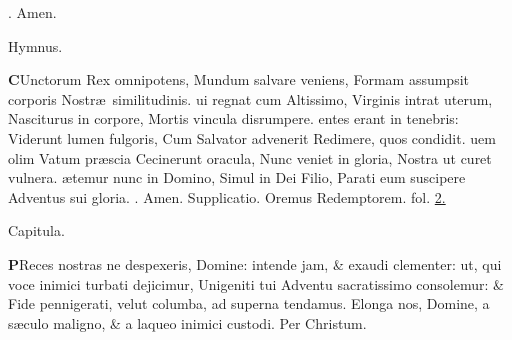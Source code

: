 \documentclass[letter,11pt]{book}
\makeatletter
\DeclareRobustCommand{\Rbar}{\vers@resp{0pt}{R}}
\newcommand{\vers@resp@sym}{\raisebox{0.2ex}{\rotatebox[origin=c]{-20}{$\m@th\rceil$}}}
\newcommand{\vers@resp}[2]{%
  {\ooalign{\hidewidth\kern#1\vers@resp@sym\hidewidth\cr#2\cr}}%
}%
\def\R{\color{Red} \Rbar . \color{black}}
\makeatother
\begin{document}
\begin{multicols}{2}
\newline \R Amen.
\vspace{-.75em} \begin{center} \color{Red} Hymnus. \end{center} \vspace{-.75em}
\lettrine[lines=2]{\bfseries \color{Red} C}{}Unctorum Rex omnipotens,
\newline Mundum salvare veniens,
\newline \indent Formam assumpsit corporis
\newline \indent Nostr\ae \ similitudinis.
ui regnat cum Altissimo,
\newline \indent Virginis intrat uterum,
\newline \indent Nasciturus in corpore,
\newline \indent Mortis vincula disrumpere.
entes erant in tenebris:
\newline \indent Viderunt lumen fulgoris,
\newline \indent Cum Salvator advenerit
\newline \indent Redimere, quos condidit.
uem olim Vatum pr\ae scia
\newline \indent Cecinerunt oracula,
\newline \indent Nunc veniet in gloria,
\newline \indent Nostra ut curet vulnera.
\ae temur nunc in Domino,
\newline \indent Simul in Dei Filio,
\newline \indent Parati eum suscipere
\newline \indent Adventus sui gloria. \R Amen.
\newline \color{Red} Supplicatio. \color{black} Oremus Redemptorem. \color{Red} fol. \color{black} \hyperlink{Supplicatio}{2.}
\vspace{-.75em} \begin{center} \color{Red} Capitula. \end{center} \vspace{-.75em}
\lettrine[lines=2]{\bfseries \color{Red} P}{}Reces nostras ne despexeris, Domine: intende jam, \& exaudi clementer: ut, qui voce inimici turbati dejicimur, Unigeniti tui Adventu sacratissimo consolemur: \& Fide pennigerati, velut columba, ad superna tendamus. Elonga nos, Domine, a s\ae culo maligno, \& a laqueo inimici custodi. Per Christum.

\end{multicols}
\end{document}
